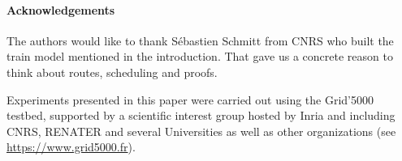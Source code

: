 \documentclass[runningheads]{llncs}
\begin{document}
\paragraph{Acknowledgements} The authors would like to thank Sébastien Schmitt from CNRS who built the train model mentioned in the introduction. That gave us a concrete reason to think about routes, scheduling and proofs.

Experiments presented in this paper were carried out using the Grid'5000 testbed, supported by a scientific interest group hosted by Inria and including CNRS, RENATER and several Universities as well as other organizations (see \url{https://www.grid5000.fr}).



\end{document}
